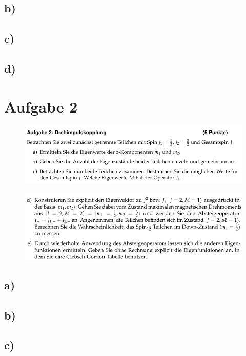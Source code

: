 \subsection{b)}

\subsection{c)}

\subsection{d)}

\section{Aufgabe 2}
\begin{figure}[H]
    \centering
    \includegraphics[width=\textwidth]{images/Aufgabe2a.jpg}
\end{figure}

\begin{figure}[H]
    \centering
    \includegraphics[width=\textwidth]{images/Aufgabe2b.jpg}
\end{figure}

\subsection{a)}

\subsection{b)}

\subsection{c)}

